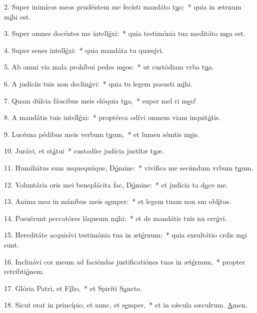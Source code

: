 2. Super inimícos meos prudéntem me fecísti mandáto t\uline{u}o:~* quia in ætrnum m\uline{i}hi est.\par 
3. Super omnes docéntes me intell\uline{é}xi:~* quia testimónia tua meditáto m\uline{e}a est.\par 
4. Super senes intell\uline{é}xi:~* quia mandáta tu quæs\uline{í}vi.\par 
5. Ab omni via mala prohíbui pedes m\uline{e}os:~* ut custódiam vrba t\uline{u}a.\par 
6. A judíciis tuis non declin\uline{á}vi:~* quia tu legem posusti m\uline{i}hi.\par 
7. Quam dúlcia fáucibus meis elóquia t\uline{u}a,~* super mel ri m\uline{e}o!\par 
8. A mandátis tuis intell\uline{é}xi:~* proptérea odívi omnem viam inquit\uline{á}tis.\par 
9. Lucérna pédibus meis verbum t\uline{u}um,~* et lumen sémtis m\uline{e}is.\par 
10. Jurávi, et st\uline{á}tui~* custodíre judícia justítæ t\uline{u}æ.\par 
11. Humiliátus sum usquequáque, D\uline{ó}mine:~* vivífica me secúndum vrbum t\uline{u}um.\par 
12. Voluntária oris mei beneplácita fac, D\uline{ó}mine:~* et judícia ta d\uline{o}ce me.\par 
13. Anima mea in mánibus meis s\uline{e}mper:~* et legem tuam non sm obl\uline{í}tus.\par 
14. Posuérunt peccatóres láqueum m\uline{i}hi:~* et de mandátis tuis nn err\uline{á}vi.\par 
15. Hereditáte acquisívi testimónia tua in æt\uline{é}rnum:~* quia exsultátio crdis m\uline{e}i sunt.\par 
16. Inclinávi cor meum ad faciéndas justificatiónes tuas in æt\uline{é}rnum,~* propter retribti\uline{ó}nem.\par 
17. Glória Patri, et F\uline{í}lio,~* et Spiríti S\uline{a}ncto.\par 
18. Sicut erat in princípio, et nunc, et s\uline{e}mper,~* et in sǽcula sæculrum. \uline{A}men.\par 
